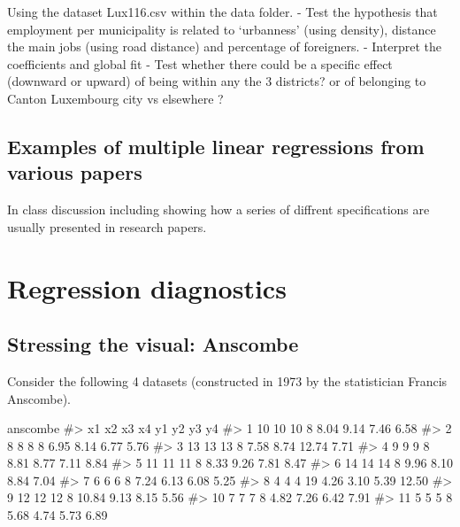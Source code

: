 \documentclass[
  letterpaper,
  DIV=11,
  numbers=noendperiod]{scrreprt}
\newenvironment{Shaded}{\begin{snugshade}}{\end{snugshade}}
\newcommand{\CommentTok}[1]{\textcolor[rgb]{0.37,0.37,0.37}{#1}}
\newcommand{\NormalTok}[1]{\textcolor[rgb]{0.00,0.23,0.31}{#1}}
\begin{document}
Using the dataset Lux116.csv within the data folder. - Test the
hypothesis that employment per municipality is related to `urbanness'
(using density), distance the main jobs (using road distance) and
percentage of foreigners. - Interpret the coefficients and global fit -
Test whether there could be a specific effect (downward or upward) of
being within any the 3 districts? or of belonging to Canton Luxembourg
city vs elsewhere ?

\section{Examples of multiple linear regressions from various
papers}\label{examples-of-multiple-linear-regressions-from-various-papers}

In class discussion including showing how a series of diffrent
specifications are usually presented in research papers.

\chapter{Regression diagnostics}\label{regression-diagnostics}

\section{Stressing the visual:
Anscombe}\label{stressing-the-visual-anscombe}

Consider the following 4 datasets (constructed in 1973 by the
statistician Francis Anscombe).

\begin{Shaded}
\begin{Highlighting}[]
\NormalTok{anscombe}
\CommentTok{\#\textgreater{}    x1 x2 x3 x4    y1   y2    y3    y4}
\CommentTok{\#\textgreater{} 1  10 10 10  8  8.04 9.14  7.46  6.58}
\CommentTok{\#\textgreater{} 2   8  8  8  8  6.95 8.14  6.77  5.76}
\CommentTok{\#\textgreater{} 3  13 13 13  8  7.58 8.74 12.74  7.71}
\CommentTok{\#\textgreater{} 4   9  9  9  8  8.81 8.77  7.11  8.84}
\CommentTok{\#\textgreater{} 5  11 11 11  8  8.33 9.26  7.81  8.47}
\CommentTok{\#\textgreater{} 6  14 14 14  8  9.96 8.10  8.84  7.04}
\CommentTok{\#\textgreater{} 7   6  6  6  8  7.24 6.13  6.08  5.25}
\CommentTok{\#\textgreater{} 8   4  4  4 19  4.26 3.10  5.39 12.50}
\CommentTok{\#\textgreater{} 9  12 12 12  8 10.84 9.13  8.15  5.56}
\CommentTok{\#\textgreater{} 10  7  7  7  8  4.82 7.26  6.42  7.91}
\CommentTok{\#\textgreater{} 11  5  5  5  8  5.68 4.74  5.73  6.89}
\end{Highlighting}
\end{Shaded}
\end{document}
